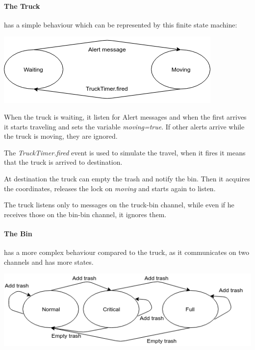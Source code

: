 \documentclass[a4paper,12pt,notitlepage]{report}
\begin{document}
\paragraph{The Truck}
has a simple behaviour which can be represented by this finite state machine:

\begin{center}
    \includegraphics[scale=0.7]{truck.png}
\end{center}

When the truck is waiting, it listen for Alert messages and when the first arrives it starts traveling and sets the variable \emph{moving=true}. 
If other alerts arrive while the truck is moving, they are ignored.

The \emph{TruckTimer.fired} event is used to simulate the travel, when it fires it means that the truck is arrived to destination.

At destination the truck can empty the trash and notify the bin. Then it acquires the coordinates, releases the lock on \emph{moving} and starts again to listen.

The truck listens only to messages on the truck-bin channel, while even if he receives those on the bin-bin channel, it ignores them.

\paragraph*{The Bin} has a more complex behaviour compared to the truck, as it communicates on two channels and has more states.

\begin{center}
    \includegraphics[scale=0.7]{bin.png}
\end{center}
\end{document}
